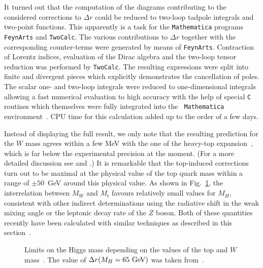 It turned out that the computation of the diagrams contributing to the
considered corrections to $\Delta r$ could be reduced to two-loop
tadpole integrals and two-point functions. This apparently is a task for
the {\tt Mathematica} programs {\tt FeynArts} and {\tt TwoCalc}.  The
various contributions to $\Delta r$ together with the corresponding
counter-terms were generated by means of {\tt FeynArts}.  Contraction of
Lorentz indices, evaluation of the Dirac algebra and the two-loop tensor
reduction was performed by {\tt TwoCalc}.  The resulting expressions
were split into finite and divergent pieces which explicitly
demonstrates the cancellation of poles.  The scalar one- and two-loop
integrals were reduced to one-dimensional integrals allowing a fast
numerical evaluation to high accuracy with the help of special {\tt C}
routines which themselves were fully integrated into the {\tt
  Mathematica} environment~\cite{Bauetal}.  CPU time for this
calculation added up to the order of a few days.

Instead of displaying the full result, we only note that the resulting
prediction for the $W$ mass agrees within a few MeV with the one of the
heavy-top expansion~\cite{DegGamPasSir98}, which is far
below the experimental precision at the moment. (For a more detailed
discussion see \cite{WeiBarc98} and \cite{GamBarc98}.) It is remarkable
that the top-induced corrections turn out to be maximal at the physical
value of the top quark mass within a range of $\pm 50$~GeV around this
physical value.  As shown in Fig.~\ref{fig::MH-MW}, the interrelation
between $M_W$ and $M_t$ favours relatively small values for $M_H$,
consistent with other indirect determinations using the radiative shift
in the weak mixing angle or the leptonic decay rate of the $Z$ boson.
Both of these quantities recently have been calculated with similar
techniques as described in this section~\cite{WeiRhein98}.

\begin{figure}
  \begin{center}
    \leavevmode
    \hfill
    \parbox{\captionwidth}{
    \caption[]{\label{mwplotcmpl.eps}\sloppy
      Limits on the Higgs mass depending on the values of the top and
      $W$ mass~\cite{WeiBarc98}. The value of $\Delta r(M_H=65~{\rm
      GeV})$ was taken from~\cite{DegGamPasSir98}.
      \label{fig::MH-MW}
      }}
  \end{center}
\end{figure}
%

